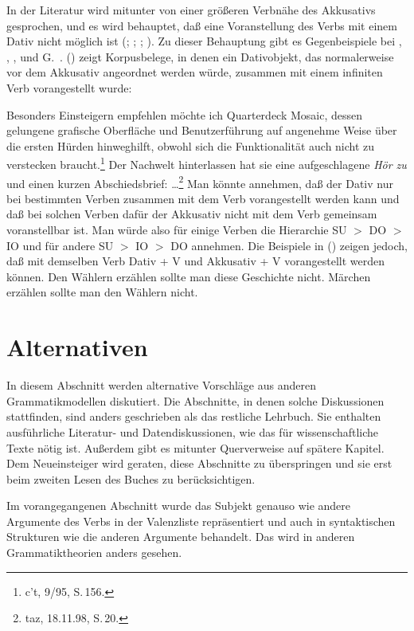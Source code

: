 In der Literatur wird mitunter von einer größeren Verbnähe des Akkusativs gesprochen,
und es wird behauptet, daß eine Voranstellung des Verbs mit einem Dativ nicht möglich
ist (\citealt{Haftka81a}; \citealt{Haider82}; \citealt{Wegener90}; \citealt{Zifonun92a}).
Zu dieser Behauptung gibt es Gegenbeispiele bei \citet{Uszkoreit87a}, \citet{SS88a}, %
\citet{Oppenrieder91a}, \citet{Grewendorf93} und G.\ \citet[]{GMueller98a}.
() zeigt Korpusbelege, in denen ein Dativobjekt, das normalerweise vor dem Akkusativ
angeordnet werden würde, zusammen mit einem infiniten Verb vorangestellt wurde:

\eal
\label{bsp-syntax-pvp-besonders}
\ex Besonders Einsteigern empfehlen möchte ich Quarterdeck Mosaic, dessen gelungene grafische 
    Oberfläche und Benutzerführung auf angenehme Weise über die ersten Hürden 
    hinweghilft, obwohl sich die Funktionalität auch nicht zu verstecken braucht.\footnote{
      c't, 9/95, S.\,156.}
\ex Der Nachwelt hinterlassen hat sie eine aufgeschlagene \textit{Hör zu\/} und einen kurzen
    Abschiedsbrief: \ldots\footnote{
      taz, 18.11.98, S.\,20.}
\zl
Man könnte annehmen, daß der Dativ nur bei bestimmten Verben zusammen mit dem Verb vorangestellt
werden kann und daß bei solchen Verben dafür der Akkusativ nicht mit dem Verb gemeinsam
voranstellbar ist. Man würde also für einige Verben die Hierarchie SU $>$ DO $>$ IO und für andere
SU $>$ IO $>$ DO annehmen. Die Beispiele in () zeigen jedoch, daß mit demselben Verb Dativ +
V und Akkusativ + V vorangestellt werden können.
\eal
\label{bsp-acc-dat-pvp}
\ex Den Wählern erzählen sollte man diese Geschichte nicht.
\ex Märchen erzählen sollte man den Wählern nicht.
\zl
{}

\section{Alternativen}

In diesem Abschnitt werden alternative Vorschläge aus anderen Grammatikmodellen diskutiert.
Die Abschnitte, in denen solche Diskussionen stattfinden, sind anders geschrieben als das restliche
Lehrbuch. Sie enthalten ausführliche Literatur- und Datendiskussionen, wie das für wissenschaftliche
Texte nötig ist. Außerdem gibt es mitunter Querverweise auf spätere Kapitel. Dem Neueinsteiger
wird geraten, diese Abschnitte zu überspringen und sie erst beim zweiten Lesen des Buches zu berücksichtigen.

Im vorangegangenen Abschnitt wurde das Subjekt genauso wie andere Argumente des Verbs
in der Valenzliste repräsentiert und auch in syntaktischen Strukturen wie die anderen
Argumente behandelt. Das wird in anderen Grammatiktheorien anders gesehen.

